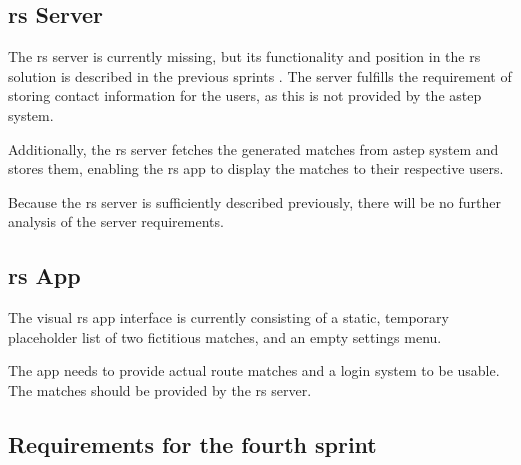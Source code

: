 \subsection{\gls{rs} Server}
The \gls{rs} server is currently missing, but its functionality and position in the \gls{rs} solution is described in the previous sprints .
The server fulfills the requirement of storing contact information for the users, as this is not provided by the \gls{astep} system.

Additionally, the \gls{rs} server fetches the generated matches from \gls{astep} system and stores them, enabling the \gls{rs} app to display the matches to their respective users.

Because the \gls{rs} server is sufficiently described previously, there will be no further analysis of the server requirements.

\subsection{\gls{rs} App}
The visual \gls{rs} app interface is currently consisting of a static, temporary placeholder list of two fictitious matches, and an empty settings menu.

The app needs to provide actual route matches and a login system to be usable.
The matches should be provided by the \gls{rs} server.




\subsection{Requirements for the fourth sprint}
